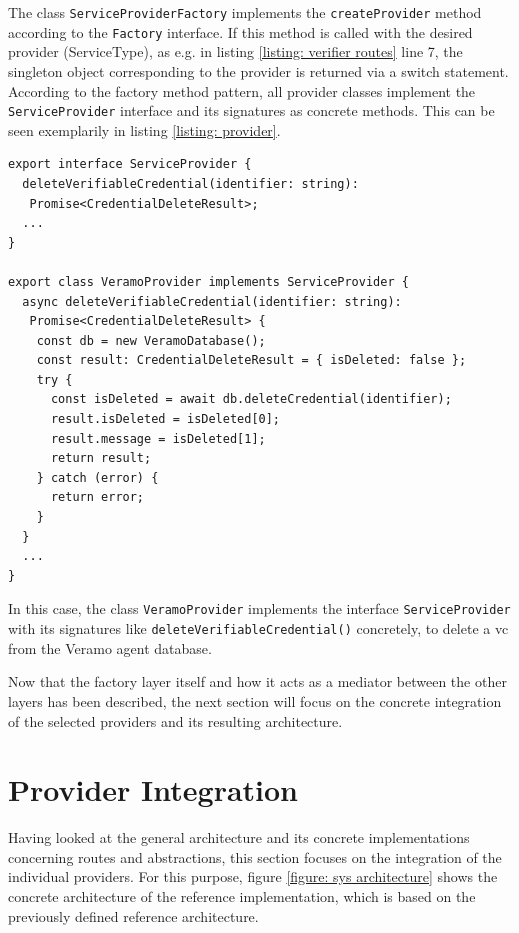     The class \texttt{ServiceProviderFactory} implements the \texttt{createProvider} method according to the \texttt{Factory} interface. If this method is called with the desired provider (ServiceType), as e.g. in listing \ref{listing: verifier routes} line 7, the singleton object corresponding to the provider is returned via a switch statement. According to the factory method pattern, all provider classes implement the \texttt{ServiceProvider} interface and its signatures as concrete methods. This can be seen exemplarily in listing \ref{listing: provider}.
    \newline

\begin{lstlisting}[style=ES6, caption=Example of provider implementation, label={listing: provider}]
export interface ServiceProvider {
  deleteVerifiableCredential(identifier: string): 
   Promise<CredentialDeleteResult>;
  ...
}

export class VeramoProvider implements ServiceProvider {
  async deleteVerifiableCredential(identifier: string): 
   Promise<CredentialDeleteResult> {
    const db = new VeramoDatabase();
    const result: CredentialDeleteResult = { isDeleted: false };
    try {
      const isDeleted = await db.deleteCredential(identifier);
      result.isDeleted = isDeleted[0];
      result.message = isDeleted[1];
      return result;
    } catch (error) {
      return error;
    }
  }
  ...
}\end{lstlisting}

    In this case, the class \texttt{VeramoProvider} implements the interface \texttt{ServiceProvider} with its signatures like \texttt{deleteVerifiableCredential()} concretely, to delete a \ac{vc} from the Veramo agent database.
    
    Now that the factory layer itself and how it acts as a mediator between the other layers has been described, the next section will focus on the concrete integration of the selected providers and its resulting architecture.
    
        
    \section{Provider Integration}
    
    Having looked at the general architecture and its concrete implementations concerning routes and abstractions, this section focuses on the integration of the individual providers. For this purpose, figure \ref{figure: sys architecture} shows the concrete architecture of the reference implementation, which is based on the previously defined reference architecture. 
    
